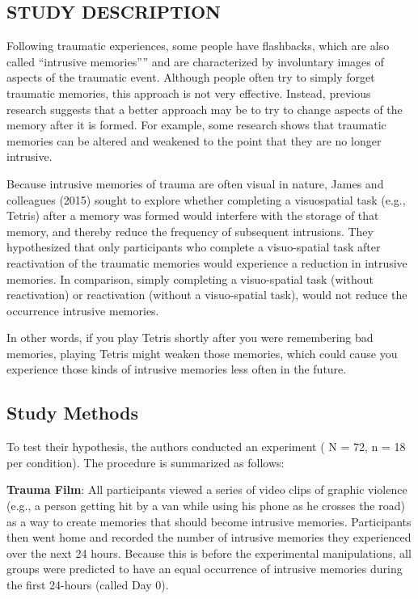 \documentclass[
]{book}
\begin{document}
\hypertarget{study-description-3}{%
\subsection{STUDY DESCRIPTION}\label{study-description-3}}

Following traumatic experiences, some people have flashbacks, which are also called ``intrusive memories'''' and are characterized by involuntary images of aspects of the traumatic event. Although people often try to simply forget traumatic memories, this approach is not very effective. Instead, previous research suggests that a better approach may be to try to change aspects of the memory after it is formed. For example, some research shows that traumatic memories can be altered and weakened to the point that they are no longer intrusive.

Because intrusive memories of trauma are often visual in nature, James and colleagues (2015) sought to explore whether completing a visuospatial task (e.g., Tetris) after a memory was formed would interfere with the storage of that memory, and thereby reduce the frequency of subsequent intrusions. They hypothesized that only participants who complete a visuo-spatial task after reactivation of the traumatic memories would experience a reduction in intrusive memories. In comparison, simply completing a visuo-spatial task (without reactivation) or reactivation (without a visuo-spatial task), would not reduce the occurrence intrusive memories.

In other words, if you play Tetris shortly after you were remembering bad memories, playing Tetris might weaken those memories, which could cause you experience those kinds of intrusive memories less often in the future.

\hypertarget{study-methods}{%
\subsection{Study Methods}\label{study-methods}}

To test their hypothesis, the authors conducted an experiment ( N = 72, n = 18 per condition). The procedure is summarized as follows:

\textbf{Trauma Film}: All participants viewed a series of video clips of graphic violence (e.g., a person getting hit by a van while using his phone as he crosses the road) as a way to create memories that should become intrusive memories. Participants then went home and recorded the number of intrusive memories they experienced over the next 24 hours. Because this is before the experimental manipulations, all groups were predicted to have an equal occurrence of intrusive memories during the first 24-hours (called Day 0).
\end{document}
